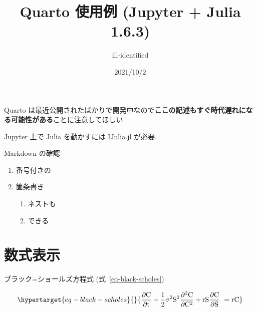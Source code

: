 \documentclass[
  letterpaper,
  DIV=11,
  pandoc,
  ja=standard,
  jafont=haranoaji]{bxjsarticle}
\title{Quarto 使用例 (Jupyter + Julia 1.6.3)}
\author{ill-identified}
\date{2021/10/2}
\providecommand{\tightlist}{%
  \setlength{\itemsep}{0pt}\setlength{\parskip}{0pt}}
\begin{document}
\maketitle

{
\hypersetup{linkcolor=}
\setcounter{tocdepth}{3}
\tableofcontents
}
\begin{tcolorbox}[bottomtitle=1mm, toptitle=1mm, titlerule=0mm, left=2mm, title=\textcolor{quarto-callout-caution-color}{\faFire}\hspace{0.5em}注意, rightrule=.15mm, arc=.35mm, colback=white, toprule=.15mm, bottomrule=.15mm, colbacktitle=quarto-callout-caution-color!10!white, leftrule=.75mm, colframe=quarto-callout-caution-color, coltitle=black]
Quarto
は最近公開されたばかりで開発中なので\textbf{ここの記述もすぐ時代遅れになる可能性がある}ことに注意してほしい.
\end{tcolorbox}

Jupyter 上で Julia を動かすには
\href{https://github.com/JuliaLang/IJulia.jl}{IJulia.jl} が必要.

Markdown の確認

\begin{enumerate}
\def\labelenumi{\arabic{enumi}.}
\tightlist
\item
  番号付きの
\item
  箇条書き

  \begin{enumerate}
  \def\labelenumii{\arabic{enumii}.}
  \tightlist
  \item
    ネストも
  \item
    できる
  \end{enumerate}
\end{enumerate}

\hypertarget{ux6570ux5f0fux8868ux793a}{%
\section{数式表示}\label{ux6570ux5f0fux8868ux793a}}

ブラック=ショールズ方程式 (式~\ref{eq-black-scholes})

\begin{equation}\protect\hypertarget{eq-black-scholes}{}{
\frac{\partial \mathrm C}{ \partial \mathrm t } + \frac{1}{2}\sigma^{2} \mathrm S^{2}
\frac{\partial^{2} \mathrm C}{\partial \mathrm C^2}
  + \mathrm r \mathrm S \frac{\partial \mathrm C}{\partial \mathrm S}\ =
  \mathrm r \mathrm C 
}\label{eq-black-scholes}\end{equation}
\end{document}
